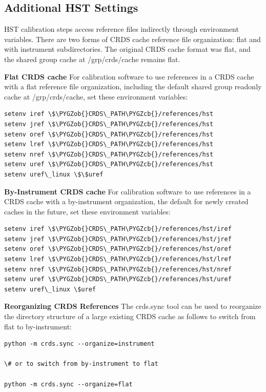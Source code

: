 \documentclass[letterpaper,10pt,english]{sphinxmanual}
\def\PYGZob{\char`\{}
\def\PYGZcb{\char`\}}
\begin{document}
\subsection{Additional HST Settings}
\label{installation:additional-hst-settings}
HST calibration steps access reference files indirectly through environment variables.  There are two forms
of CRDS cache reference file organization:  flat and with instrument subdirectories.   The original CRDS cache
format was flat,  and the shared group cache at /grp/crds/cache remains flat.

\textbf{Flat CRDS cache} For calibration software to use references in a CRDS cache with a flat reference file
organization, including the default shared group readonly cache at /grp/crds/cache,  set these environment
variables:

\begin{Verbatim}[commandchars=\\\{\}]
setenv iref \$\PYGZob{}CRDS\_PATH\PYGZcb{}/references/hst
setenv jref \$\PYGZob{}CRDS\_PATH\PYGZcb{}/references/hst
setenv oref \$\PYGZob{}CRDS\_PATH\PYGZcb{}/references/hst
setenv lref \$\PYGZob{}CRDS\_PATH\PYGZcb{}/references/hst
setenv nref \$\PYGZob{}CRDS\_PATH\PYGZcb{}/references/hst
setenv uref \$\PYGZob{}CRDS\_PATH\PYGZcb{}/references/hst
setenv uref\_linux \$\$uref
\end{Verbatim}

\textbf{By-Instrument CRDS cache} For calibration software to use references in a CRDS cache with a by-instrument
organization, the default for newly created caches in the future, set these environment variables:

\begin{Verbatim}[commandchars=\\\{\}]
setenv iref \$\PYGZob{}CRDS\_PATH\PYGZcb{}/references/hst/iref
setenv jref \$\PYGZob{}CRDS\_PATH\PYGZcb{}/references/hst/jref
setenv oref \$\PYGZob{}CRDS\_PATH\PYGZcb{}/references/hst/oref
setenv lref \$\PYGZob{}CRDS\_PATH\PYGZcb{}/references/hst/lref
setenv nref \$\PYGZob{}CRDS\_PATH\PYGZcb{}/references/hst/nref
setenv uref \$\PYGZob{}CRDS\_PATH\PYGZcb{}/references/hst/uref
setenv uref\_linux \$uref
\end{Verbatim}

\textbf{Reorganizing CRDS References} The crds.sync tool can be used to reorganize the directory structure of a large
existing CRDS cache as follows to switch from flat to by-instrument:

\begin{Verbatim}[commandchars=\\\{\}]
python -m crds.sync --organize=instrument

\# or to switch from by-instrument to flat

python -m crds.sync --organize=flat
\end{Verbatim}
\end{document}
